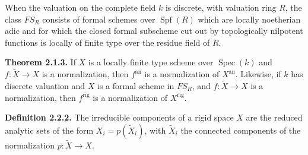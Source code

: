 When the valuation on the complete field $k$ is discrete, with valuation
ring $R$, the class $FS_R$ consists of formal schemes over
$\operatorname{Spf}(R)$ which are locally noetherian adic and for which the
closed formal subscheme cut out by topologically nilpotent functions is
locally of finite type over the residue field of $R$.

\textbf{Theorem 2.1.3.} If $X$ is a locally finite type scheme over
$\operatorname{Spec}(k)$ and $f:\widetilde X\to X$ is a normalization, then
$f^{\mathrm{an}}$ is a normalization of $X^{\mathrm{an}}$. Likewise, if $k$
has discrete valuation and $X$ is a formal scheme in $FS_R$, and
$f:\widetilde X\to X$ is a normalization, then $f^{\mathrm{rig}}$ is a
normalization of $X^{\mathrm{rig}}$.

\textbf{Definition 2.2.2.} The irreducible components of a rigid space $X$
are the reduced analytic sets of the form $X_i=p(\widetilde X_i)$, with
$\widetilde X_i$ the connected components of the normalization
$p:\widetilde X\to X$.
